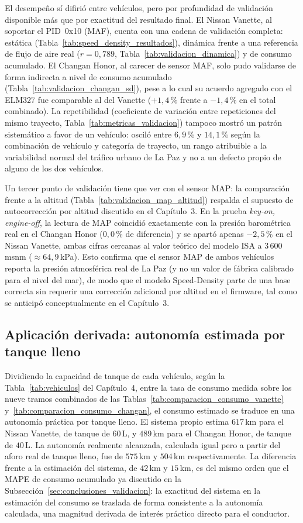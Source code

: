 El desempeño sí difirió entre vehículos, pero por profundidad de validación disponible más que por exactitud del resultado final. El Nissan Vanette, al soportar el PID~0x10 (MAF), cuenta con una cadena de validación completa: estática (Tabla~\ref{tab:speed_density_resultados}), dinámica frente a una referencia de flujo de aire real ($r=0{,}789$, Tabla~\ref{tab:validacion_dinamica}) y de consumo acumulado. El Changan Honor, al carecer de sensor MAF, solo pudo validarse de forma indirecta a nivel de consumo acumulado (Tabla~\ref{tab:validacion_changan_sd}), pese a lo cual su acuerdo agregado con el ELM327 fue comparable al del Vanette ($+1{,}4\,\%$ frente a $-1{,}4\,\%$ en el total combinado). La repetibilidad (coeficiente de variación entre repeticiones del mismo trayecto, Tabla~\ref{tab:metricas_validacion}) tampoco mostró un patrón sistemático a favor de un vehículo: osciló entre $6{,}9\,\%$ y $14{,}1\,\%$ según la combinación de vehículo y categoría de trayecto, un rango atribuible a la variabilidad normal del tráfico urbano de La Paz y no a un defecto propio de alguno de los dos vehículos.

Un tercer punto de validación tiene que ver con el sensor MAP: la comparación frente a la altitud (Tabla~\ref{tab:validacion_map_altitud}) respalda el supuesto de autocorrección por altitud discutido en el Capítulo~3. En la prueba \textit{key-on, engine-off}, la lectura de MAP coincidió exactamente con la presión barométrica real en el Changan Honor ($0{,}0\,\%$ de diferencia) y se apartó apenas $-2{,}5\,\%$ en el Nissan Vanette, ambas cifras cercanas al valor teórico del modelo ISA a $3\,600$\,msnm ($\approx 64{,}9$\,kPa). Esto confirma que el sensor MAP de ambos vehículos reporta la presión atmosférica real de La Paz (y no un valor de fábrica calibrado para el nivel del mar), de modo que el modelo Speed-Density parte de una base correcta sin requerir una corrección adicional por altitud en el firmware, tal como se anticipó conceptualmente en el Capítulo~3.

\subsection{Aplicación derivada: autonomía estimada por tanque lleno}
\label{sec:conclusiones_autonomia}

Dividiendo la capacidad de tanque de cada vehículo, según la Tabla~\ref{tab:vehiculos} del Capítulo~4, entre la tasa de consumo medida sobre los nueve tramos combinados de las Tablas~\ref{tab:comparacion_consumo_vanette} y~\ref{tab:comparacion_consumo_changan}, el consumo estimado se traduce en una autonomía práctica por tanque lleno. El sistema propio estima $617$\,km para el Nissan Vanette, de tanque de $60$\,L, y $489$\,km para el Changan Honor, de tanque de $40$\,L. La autonomía realmente alcanzada, calculada igual pero a partir del aforo real de tanque lleno, fue de $575$\,km y $504$\,km respectivamente. La diferencia frente a la estimación del sistema, de $42$\,km y $15$\,km, es del mismo orden que el MAPE de consumo acumulado ya discutido en la Subsección~\ref{sec:conclusiones_validacion}: la exactitud del sistema en la estimación del consumo se traslada de forma consistente a la autonomía calculada, una magnitud derivada de interés práctico directo para el conductor.


